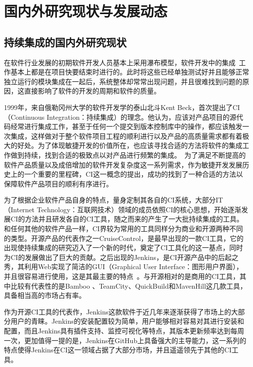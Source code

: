 \section{国内外研究现状与发展动态}

\subsection{持续集成的国内外研究现状}
  
  在软件行业发展的初期软件开发人员基本上采用瀑布模型，软件开发中的集成~\cite{12}工作基本上都是在项目快要结束时进行的。此时将这些已经单独测试好并且能够正常独立运行的模块集成在一起后，系统整体却常常出现问题，并且很难找到问题的原因，这直接影响了软件的开发的周期和软件的质量。
  
  1999年，来自俄勒冈州大学的软件开发学的泰山北斗Kent Beck，首次提出了CI（Continuous Integration：持续集成）的理念。他认为，应该对产品项目的源代码经常进行集成工作，甚至于任何一个提交到版本控制库中的操作，都应该触发一次集成，这样做对于整个软件项目工程的顺利进行以及产品的高质量需求都有着极大的好处。为了体现敏捷开发的价值所在，也应该寻找合适的方法将软件的集成工作做到持续，找到合适的极致点以对产品进行频繁的集成。~\cite{13}为了满足不断提高的软件产品质量以及成倍增加的软件开发复杂度这一系列需求，作为敏捷开发发展历史上的一个重要的里程碑，CI这一概念的提出，成功的找到了一种合适的方法以保障软件产品项目的顺利有序进行。
  
  为了根据企业软件产品自身的特点，量身定制其各自的CI系统，大部分IT（Internet Technology：互联网技术）领域的成员依照CI的核心思想，开始逐渐发展CI的方法并且研发各自的CI工具，随之而来的产生了一大批持续集成的工具。和任何其他的软件产品一样，CI界较为常用的工具同样分为商业和开源两种不同的类型。开源产品的代表作之一CruiseControl，是最早出现的一款CI工具，它的出现使持续集成的研究迈入了一个新的时代，奠定了CI工具化的这一基点，同时为CI的发展做出了巨大的贡献。之后出现的Jenkins，是CI开源产品中的后起之秀，其利用Web实现了简洁的GUI（Graphical User Interface：图形用户界面），并且很容易进行使用，这是其最主要的特点~\cite{14}。与开源相对的是商用的CI工具，其中比较有代表性的是Bamboo 、TeamCity、QuickBuild和MavenHill这几款工具，具备相当高的市场占有率。
  
  作为开源CI工具的代表作，Jenkins这款软件于近几年来逐渐获得了市场上的大部分用户的青睐。Jenkins的安装配置较为简单，用户能够相对容易对其进行安装和配置，而且Jenkins具有插件支持、监控可视化等特点，其版本更新频率达到每周一次，更加值得一提的是，Jenkins在GitHub上具备强大的主导能力，这一系列的特点使得Jenkins在CI这一领域占据了大部分市场，并且遥遥领先于其他的CI工具。~\cite{15, 16}
  
